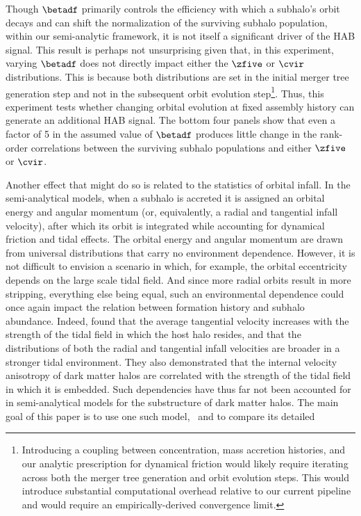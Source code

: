 Though $\betadf$ primarily controls the efficiency with which a subhalo's orbit decays and can shift the normalization of the surviving subhalo population, within our semi-analytic framework, it is not itself a significant driver of the HAB signal. This result is perhaps not unsurprising given that, in this experiment, varying $\betadf$ does not directly impact either the $\zfive$ or $\cvir$ distributions. This is because both distributions are set in the initial merger tree generation step and not in the subsequent orbit evolution step\footnote{Introducing a coupling between concentration, mass accretion histories, and our analytic prescription for dynamical friction would likely require iterating across both the merger tree generation and orbit evolution steps. This would introduce substantial computational overhead relative to our current pipeline and would require an empirically-derived convergence limit.}. Thus, this experiment tests whether changing orbital evolution at fixed assembly history can generate an additional HAB signal. The bottom four panels show that even a factor of 5 in the assumed value of $\betadf$ produces little change in the rank-order correlations between the surviving subhalo populations and either $\zfive$ or $\cvir$.

Another effect that might do so is related to the statistics of orbital infall. In the semi-analytical models, when a subhalo is accreted it is assigned an orbital energy and angular momentum (or, equivalently, a radial and tangential infall velocity), after which its orbit is integrated while accounting for dynamical friction and tidal effects. The orbital energy and angular momentum are drawn from universal distributions that carry no environment dependence. However, it is not difficult to envision a scenario in which, for example, the orbital eccentricity depends on the large scale tidal field. And since more radial orbits result in more stripping, everything else being equal, such an environmental dependence could once again impact the relation between formation history and subhalo abundance. Indeed, \citet{Shi.etal.15} found that the average tangential velocity increases with the strength of the tidal field in which the host halo resides, and that the distributions of both the radial and tangential infall velocities are broader in a stronger tidal environment. They also demonstrated that the internal velocity anisotropy of dark matter
halos are correlated with the strength of the tidal field in which it is embedded. Such dependencies have
thus far not been accounted for in semi-analytical models for the substructure of dark matter halos.
The main goal of this paper is to use one such model, \SatGen\, and to compare its detailed 


